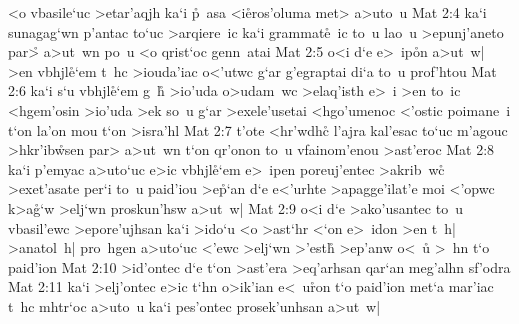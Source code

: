<o
vbasile`uc
>etar'aqjh
ka`i
\r{p}~asa
<i\r{e}ros'oluma
met>
a>uto~u\bibvsend
\vs Mat 2:4
ka`i
sunagag`wn
p'antac
to`uc
>arqiere~ic
ka`i
grammat\r{e}~ic
to~u
lao~u
>epunj'aneto
par>\r{}
a>ut~wn
po~u
<o
qrist`oc
genn~atai\bibvsend
\vs Mat 2:5
o<i
d`e
e>~ip\r{o}n
a>ut~w|
>en
vbhjl\r{e}`em
t~hc
>iouda'iac
o<'utwc
g`ar
g'egraptai
di`a
to~u
prof'htou\bibvsend
\vs Mat 2:6
ka`i
s`u
vbhjl\r{e}`em
g~h\r{}
>io'uda
o>udam~wc
>elaq'isth
e>~i
>en
to~ic
<hgem'osin
>io'uda
>ek
so~u
g`ar
>exele'usetai
<hgo'umenoc
<'ostic
poimane~i
t`on
la'on
mou
t`on
>isra'hl\bibvsend
\vs Mat 2:7
t'ote
<hr'wdhc\r{}
l'ajra
kal'esac
to`uc
m'agouc
>hkr'ib\r{w}sen
par>
a>ut~wn
t`on
qr'onon
to~u
vfainom'enou
>ast'eroc\bibvsend
\vs Mat 2:8
ka`i
p'emyac
a>uto`uc
e>ic
vbhjl\r{e}`em
e>~ipen
poreuj'entec
>akrib~wc\r{}
>exet'asate
per`i
to~u
paid'iou
>e\r{p}`an
d`e
e<'urhte
>apagge'ilat'e
moi
<'opwc
k>a\r{g}`w
>elj`wn
proskun'hsw
a>ut~w|\bibvsend
\vs Mat 2:9
o<i
d`e
>ako'usantec
to~u
vbasil'ewc
>epore'ujhsan
ka`i
>ido`u
<o
>ast`hr
<`on
e>~idon
>en
t~h|
>anatol~h|
pro~hgen
a>uto`uc
<'ewc
>elj`wn
>'est\r{h}
>ep'anw
o<~u\r{}
>~hn
t`o
paid'ion\bibvsend
\vs Mat 2:10
>id'ontec
d`e
t`on
>ast'era
>eq'arhsan
qar`an
meg'alhn
sf'odra\bibvsend
\vs Mat 2:11
ka`i
>elj'ontec
e>ic
t`hn
o>ik'ian
e<~u\r{r}on
t`o
paid'ion
met`a
mar'iac
t~hc
mhtr`oc
a>uto~u
ka`i
pes'ontec
prosek'unhsan
a>ut~w|
